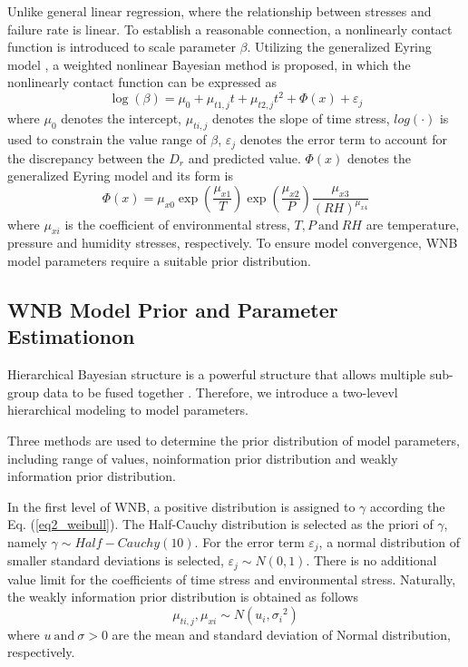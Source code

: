 \documentclass[journal,twoside,web]{ieeecolor}
\begin{document}
Unlike general linear regression, where the relationship between stresses and failure rate is linear. To establish a reasonable connection, a nonlinearly contact function is introduced to scale parameter $ \beta $. Utilizing the generalized Eyring model \cite{7430344}, a weighted nonlinear Bayesian method is proposed, in which the nonlinearly contact function can be expressed as
\begin{equation}\label{eq3Eyring}
\log(\beta) = \mu_{0} + \mu_{t1,j}t + \mu_{t2,j}t^{2} + \varPhi(x) + \varepsilon_{j}
\end{equation}
where $ \mu_{0}$ denotes the intercept, $ \mu_{ti,j}$ denotes the slope of time stress, $ log(\cdot) $ is used to constrain the value range of $ \beta $, $ \varepsilon_{j} $ denotes the error term to account for the discrepancy between the $ D_{r} $ and predicted value. $ \varPhi(x) $ denotes the generalized Eyring model and its form is 
\begin{equation}\label{eq4Eyring}
\varPhi(x) = \mu_{x0}\exp(\frac{\mu_{x1}}{T})\exp(\frac{\mu_{x2}}{P})\frac{\mu_{x3}}{(RH)^{\mu_{x4}}}
\end{equation}
where $ \mu_{xi} $ is the coefficient of environmental stress, $ T, P ~\text{and}~ RH $ are temperature, pressure and humidity stresses, respectively. To ensure model convergence, WNB model parameters require a suitable prior distribution.

\subsection{WNB Model Prior and Parameter Estimationon}
Hierarchical Bayesian structure is a powerful structure that allows multiple sub-group data to be fused together \cite{MISHRA201825}. Therefore, we introduce a two-levevl hierarchical modeling to model parameters.

Three methods are used to determine the prior distribution of model parameters, including range of values, noinformation prior distribution and weakly information prior distribution. 

In the first level of WNB, a positive distribution is assigned to $ \gamma $ according the Eq. (\ref{eq2_weibull}). The Half-Cauchy distribution is selected as the priori of  $ \gamma $, namely $ \gamma \sim Half-Cauchy(10) $. For the error term $ \varepsilon_{j} $, a normal distribution of smaller standard deviations is selected, $ \varepsilon_{j} \sim N(0, 1) $.
There is no additional value limit for the coefficients of time stress and environmental stress. Naturally, the weakly information prior distribution is obtained as follows
\begin{equation}\label{eq5prior}
\mu_{ti,j}, \mu_{xi}  \sim  N(u_{i}, {\sigma_{i}}^{2})
\end{equation}
where $ u ~\text{and}~ \sigma > 0 $ are the mean and standard deviation of Normal distribution, respectively.
\end{document}
